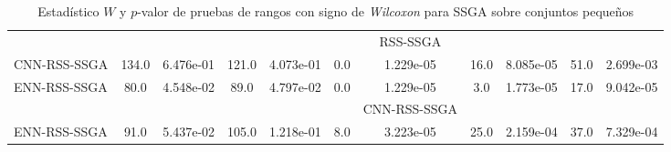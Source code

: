 \begin{table}[]
\begin{adjustbox}{max width =\textwidth}
\begin{tabular}{l c c c c c c c c c c}
\hline

 & & & & & & RSS-SSGA & & & & \\
CNN-RSS-SSGA & 134.0 & 6.476e-01 & 121.0 & 4.073e-01 & 0.0 & 1.229e-05 & 16.0 & 8.085e-05 & 51.0 & 2.699e-03 \\ 
ENN-RSS-SSGA & 80.0 & 4.548e-02 & 89.0 & 4.797e-02 & 0.0 & 1.229e-05 & 3.0 & 1.773e-05 & 17.0 & 9.042e-05 \\  

\hline

 & & & & & & CNN-RSS-SSGA & & & & \\ 
ENN-RSS-SSGA & 91.0 & 5.437e-02 & 105.0 & 1.218e-01 & 8.0 & 3.223e-05 & 25.0 & 2.159e-04 & 37.0 & 7.329e-04 \\

\hline 

\end{tabular}
\end{adjustbox}
\caption[Pruebas de \emph{Wilcoxon} entre SSGA y variaciones para conjuntos pequeños]{Estadístico $W$ y $p$-valor de pruebas de rangos con signo de \emph{Wilcoxon} para SSGA sobre conjuntos pequeños}
\label{wilcox-SSGA-peq}
\end{table}

